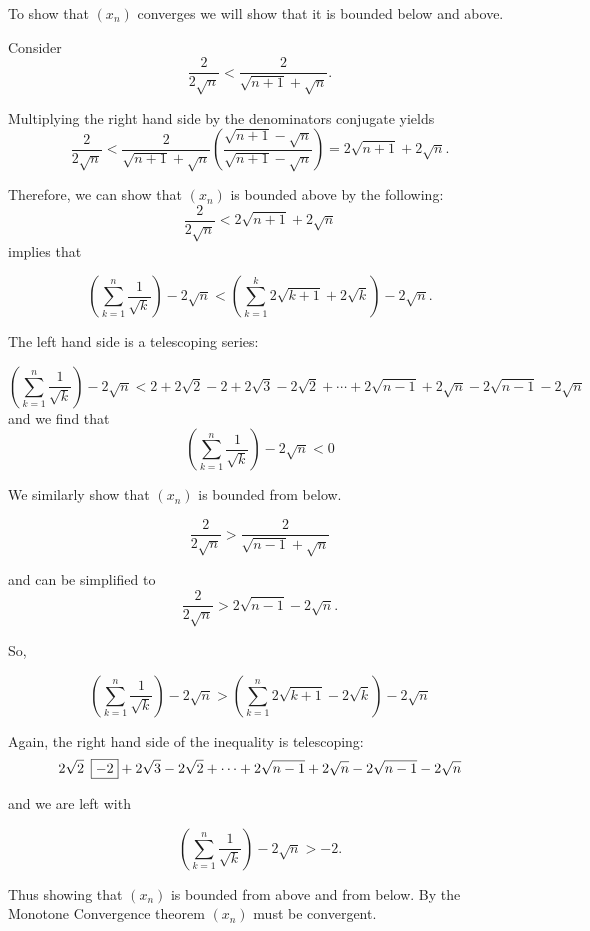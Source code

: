 \documentclass{report}
\begin{document}

\begin{myproof}
    To show that $(x_n)$ converges we will show that it is bounded below and above. 

    Consider $$\frac{2}{2 \sqrt{n}} < \frac{2}{\sqrt{n+1} + \sqrt{n}}.$$

Multiplying the right hand side by the denominators conjugate yields
 $$\frac{2}{2 \sqrt{n}} < \frac{2}{\sqrt{n+1} + \sqrt{n}} \left(\frac{\sqrt{n+1} - \sqrt{n}}{\sqrt{n+1} - \sqrt{n}}  \right) = 2\sqrt{n+1} + 2\sqrt{n}.$$

 Therefore, we can show that $(x_n)$ is bounded above by the following:
 $$\frac{2}{2 \sqrt{n}} < 2\sqrt{n+1} + 2\sqrt{n} $$ implies  that 

 $$
\left(\sum_{k=1}^{n} \frac{1}{\sqrt{k}} \right)-2 \sqrt{n} < \left( \sum_{k=1}^{k} 2\sqrt{k+1} + 2\sqrt{k} \right) - 2\sqrt{n}
 .$$

 The left hand side is a telescoping series:

 $$
\left(\sum_{k=1}^{n} \frac{1}{\sqrt{k}} \right)-2 \sqrt{n} < 2 + 2\sqrt{2} - 2 + 2\sqrt{3}- 2\sqrt{2} + \cdots + 2\sqrt{n-1} + 2\sqrt{n} - 2 \sqrt{n-1} - 2\sqrt{n}
$$
and we find that
 $$
\left(\sum_{k=1}^{n} \frac{1}{\sqrt{k}} \right)-2 \sqrt{n} < 0 $$

We similarly show that $(x_n)$ is bounded from below.

$$\frac{2}{2 \sqrt{n}} > \frac{2}{\sqrt{n-1} + \sqrt{n}}$$

and can be simplified to
 $$\frac{2}{2 \sqrt{n}} > 2\sqrt{n-1} - 2\sqrt{n}.$$
 

 So,


 $$
\left(\sum_{k=1}^{n} \frac{1}{\sqrt{k}} \right)-2 \sqrt{n} > \left( \sum_{k=1}^{n} 2\sqrt{k+1} - 2\sqrt{k} \right) - 2\sqrt{n}
 $$

Again, the right hand side of the inequality is telescoping:
 $$
 2\sqrt{2} \hspace{0.5em}\boxed{-2} + 2\sqrt{3}- 2\sqrt{2} + \cdots + 2\sqrt{n-1} + 2\sqrt{n} - 2 \sqrt{n-1} - 2\sqrt{n}
$$

 and we are left with 

$$\left(\sum_{k=1}^{n} \frac{1}{\sqrt{k}} \right)-2 \sqrt{n} > -2.$$

Thus showing that $(x_n)$ is bounded from above and from below. By the Monotone Convergence theorem $(x_n)$ must be convergent.

\end{myproof}
\end{document}
